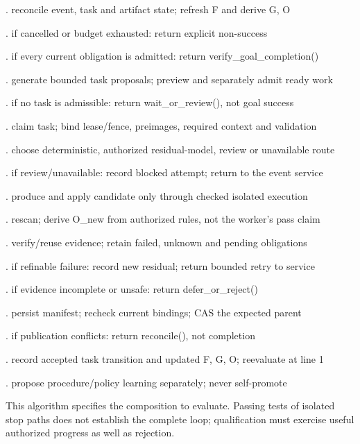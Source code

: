 . reconcile event, task and artifact state; refresh F and derive G, O\par
{}. if cancelled or budget exhausted: return explicit non-success\par
{}. if every current obligation is admitted: return verify\_goal\_completion()\par
{}. generate bounded task proposals; preview and separately admit ready work\par
{}. if no task is admissible: return wait\_or\_review(), not goal success\par
{}. claim task; bind lease/fence, preimages, required context and validation\par
{}. choose deterministic, authorized residual-model, review or unavailable route\par
{}. if review/unavailable: record blocked attempt; return to the event service\par
{}. produce and apply candidate only through checked isolated execution\par
{}. rescan; derive O\_new from authorized rules, not the worker’s pass claim\par
{}. verify/reuse evidence; retain failed, unknown and pending obligations\par
{}. if refinable failure: record new residual; return bounded retry to service\par
{}. if evidence incomplete or unsafe: return defer\_or\_reject()\par
{}. persist manifest; recheck current bindings; CAS the expected parent\par
{}. if publication conflicts: return reconcile(), not completion\par
{}. record accepted task transition and updated F, G, O; reevaluate at line 1\par
{}. propose procedure/policy learning separately; never self-promote\par

This algorithm specifies the composition to evaluate. Passing tests of isolated stop paths does
not establish the complete loop; qualification must exercise useful authorized progress as well as
rejection.




